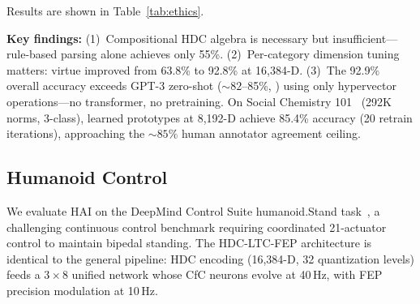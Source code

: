 \documentclass[10pt,letterpaper]{article}
\begin{document}
Results are shown in Table~\ref{tab:ethics}.

\begin{table}[ht]
\centering
\caption{ETHICS benchmark results (500 test examples/category).}
\label{tab:ethics}
\small
{}
\end{table}

\textbf{Key findings:} (1)~Compositional HDC algebra is necessary but insufficient---rule-based parsing alone achieves only 55\%. (2)~Per-category dimension tuning matters: virtue improved from 63.8\% to 92.8\% at 16,384-D. (3)~The 92.9\% overall accuracy exceeds GPT-3 zero-shot (${\sim}82$--85\%, \cite{hendrycks2021aligning}) using only hypervector operations---no transformer, no pretraining. On Social Chemistry 101~\cite{forbes2020social} (292K norms, 3-class), learned prototypes at 8,192-D achieve 85.4\% accuracy (20 retrain iterations), approaching the ${\sim}85\%$ human annotator agreement ceiling.

\subsection{Humanoid Control}
\label{sec:humanoid}

We evaluate HAI on the DeepMind Control Suite humanoid.Stand task~\cite{tassa2018deepmind}, a challenging continuous control benchmark requiring coordinated 21-actuator control to maintain bipedal standing. The HDC-LTC-FEP architecture is identical to the general pipeline: HDC encoding (16,384-D, 32 quantization levels) feeds a $3{\times}8$ unified network whose CfC neurons evolve at 40\,Hz, with FEP precision modulation at 10\,Hz.
\end{document}
